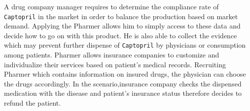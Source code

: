 \documentclass[conference]{IEEEtran}
\begin{document}
 A drug company manager requires to determine the compliance rate of \texttt{Captopril} in the market in order to balance the production based on market demand.
 Applying the Pharmer allows him to simply access to these data and decide how to go on with this product.
 He is also able to collect the evidence which may prevent further dispense of \texttt{Captopril} by physicians or consumption among patients.
 Pharmer allows insurance companies to customize and individualize their services based on patient's medical records. Recruiting Pharmer which contains information on insured drugs, the physician can choose the drugs accordingly.
 In the scenario,insurance company checks the dispensed medication with the disease and patient's insurance status therefore decides to refund the patient.

%
\end{document}
